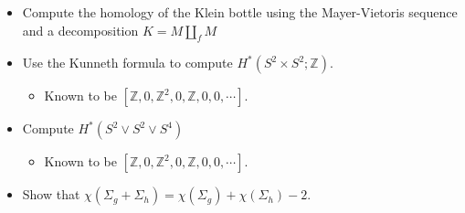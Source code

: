 \begin{itemize}
\tightlist
\item
  Compute the homology of the Klein bottle using the Mayer-Vietoris
  sequence and a decomposition \(K = M {\coprod}_f M\)
\item
  Use the Kunneth formula to compute
  \(H^*(S^2\times S^2; {\mathbb{Z}})\).

  \begin{itemize}
  \tightlist
  \item
    Known to be
    \([{\mathbb{Z}}, 0, {\mathbb{Z}}^2, 0, {\mathbb{Z}}, 0, 0, \cdots]\).
  \end{itemize}
\item
  Compute \(H^*(S^2 \vee S^2 \vee S^4)\)

  \begin{itemize}
  \tightlist
  \item
    Known to be
    \([{\mathbb{Z}}, 0, {\mathbb{Z}}^2, 0, {\mathbb{Z}}, 0, 0, \cdots]\).
  \end{itemize}
\item
  Show that
  \(\chi(\Sigma_g + \Sigma_h) = \chi(\Sigma_g) + \chi(\Sigma_h) - 2\).
\end{itemize}


\printbibliography[title=Bibliography]



